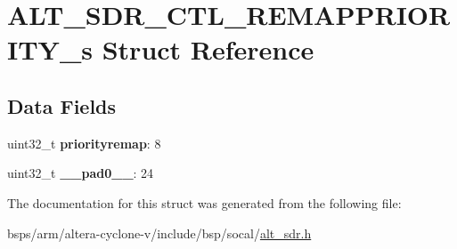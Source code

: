 \hypertarget{structALT__SDR__CTL__REMAPPRIORITY__s}{}\section{A\+L\+T\+\_\+\+S\+D\+R\+\_\+\+C\+T\+L\+\_\+\+R\+E\+M\+A\+P\+P\+R\+I\+O\+R\+I\+T\+Y\+\_\+s Struct Reference}
\label{structALT__SDR__CTL__REMAPPRIORITY__s}
\subsection*{Data Fields}
\begin{DoxyCompactItemize}
\item 
\mbox{\label{structALT__SDR__CTL__REMAPPRIORITY__s_a963085db1e2be705ab95109412804b31}} 
uint32\+\_\+t {\bfseries priorityremap}\+: 8
\item 
\mbox{\label{structALT__SDR__CTL__REMAPPRIORITY__s_a731774a56943f76ac1162ffe5bd286e9}} 
uint32\+\_\+t {\bfseries \+\_\+\+\_\+pad0\+\_\+\+\_\+}\+: 24
\end{DoxyCompactItemize}


The documentation for this struct was generated from the following file\+:\begin{DoxyCompactItemize}
\item 
bsps/arm/altera-\/cyclone-\/v/include/bsp/socal/\mbox{\hyperlink{alt__sdr_8h}{alt\+\_\+sdr.\+h}}\end{DoxyCompactItemize}
